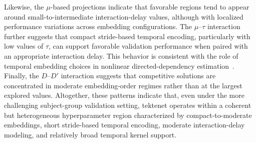 {Likewise, the $\mu$-based projections indicate that favorable regions tend to appear around small-to-intermediate interaction-delay values, although with localized performance variations across embedding configurations. The $\mu$--$\tau$ interaction further suggests that compact stride-based temporal encoding, particularly with low values of $\tau$, can support favorable validation performance when paired with an appropriate interaction delay. This behavior is consistent with the role of temporal embedding choices in nonlinear directed-dependency estimation~\cite{takens1981detecting,schreiber2000measuring}. Finally, the $D$--$D'$ interaction suggests that competitive solutions are concentrated in moderate embedding-order regimes rather than at the largest explored values. Altogether, these patterns indicate that, even under the more challenging subject-group validation setting, \gls{tektenet} operates within a coherent but heterogeneous hyperparameter region characterized by compact-to-moderate embeddings, short stride-based temporal encoding, moderate interaction-delay modeling, and relatively broad temporal kernel support.}

